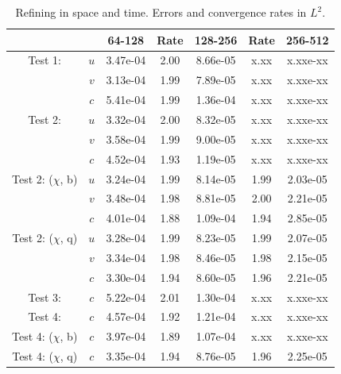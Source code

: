\documentclass[final]{siamltex}
\begin{document}
\begin{table}[h]
\begin{center}
\caption{Refining in space and time.  Errors and convergence rates in $L^2$.}
\begin{tabular}{ccccccc}
& & 64-128 & Rate & 128-256 & Rate & 256-512 \\
\hline
Test 1:             & $u$ & 3.47e-04 & 2.00 & 8.66e-05 & x.xx & x.xxe-xx \\
                    & $v$ & 3.13e-04 & 1.99 & 7.89e-05 & x.xx & x.xxe-xx \\
                    & $c$ & 5.41e-04 & 1.99 & 1.36e-04 & x.xx & x.xxe-xx \\
\hline
Test 2:             & $u$ & 3.32e-04 & 2.00 & 8.32e-05 & x.xx & x.xxe-xx \\
                    & $v$ & 3.58e-04 & 1.99 & 9.00e-05 & x.xx & x.xxe-xx \\
                    & $c$ & 4.52e-04 & 1.93 & 1.19e-05 & x.xx & x.xxe-xx \\
\hline
Test 2: ($\chi$, b) & $u$ & 3.24e-04 & 1.99 & 8.14e-05 & 1.99 & 2.03e-05 \\
                    & $v$ & 3.48e-04 & 1.98 & 8.81e-05 & 2.00 & 2.21e-05 \\
                    & $c$ & 4.01e-04 & 1.88 & 1.09e-04 & 1.94 & 2.85e-05 \\
\hline
Test 2: ($\chi$, q) & $u$ & 3.28e-04 & 1.99 & 8.23e-05 & 1.99 & 2.07e-05 \\
                    & $v$ & 3.34e-04 & 1.98 & 8.46e-05 & 1.98 & 2.15e-05 \\
                    & $c$ & 3.30e-04 & 1.94 & 8.60e-05 & 1.96 & 2.21e-05 \\
\hline
Test 3:             & $c$ & 5.22e-04 & 2.01 & 1.30e-04 & x.xx & x.xxe-xx \\
\hline
Test 4:             & $c$ & 4.57e-04 & 1.92 & 1.21e-04 & x.xx & x.xxe-xx \\
\hline
Test 4: ($\chi$, b) & $c$ & 3.97e-04 & 1.89 & 1.07e-04 & x.xx & x.xxe-xx \\
\hline
Test 4: ($\chi$, q) & $c$ & 3.35e-04 & 1.94 & 8.76e-05 & 1.96 & 2.25e-05
\end{tabular}
\end{center}
\end{table}
\end{document}
